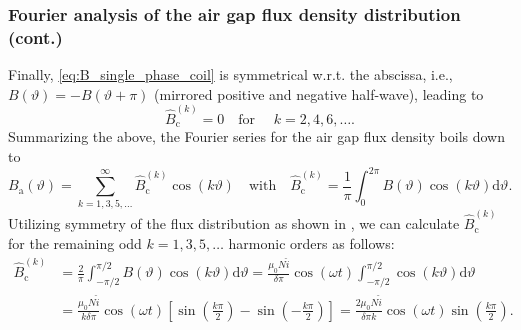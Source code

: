 \begin{frame}
	\frametitle{Fourier analysis of the air gap flux density distribution (cont.)}
        Finally, \eqref{eq:B_single_phase_coil} is symmetrical w.r.t. the abscissa, i.e., $B(\vartheta)=-B(\vartheta+\pi)$ (mirrored positive and negative half-wave), leading to
        $$\hat{B}_{\mathrm{c}}^{(k)} = 0 \quad \mbox{for } \quad k=2,4,6,\ldots .$$
        Summarizing the above, the Fourier series for the air gap flux density boils down to
        \begin{equation}
            B_\mathrm{a}(\vartheta) = \sum_{k=1,3,5,\ldots}^{\infty} \hat{B}_{\mathrm{c}}^{(k)} \cos(k \vartheta) \quad \mbox{with} \quad \hat{B}_{\mathrm{c}}^{(k)} = \frac{1}{\pi} \int_{0}^{2 \pi} B(\vartheta) \cos(k \vartheta) \mathrm{d}\vartheta.
            \label{eq:fourier_series_B_single_phase_coil_reduced}
        \end{equation}
        Utilizing symmetry of the flux distribution as shown in , we can calculate $\hat{B}_{\mathrm{c}}^{(k)}$ for the remaining odd $k=1,3,5,\ldots$ harmonic orders as follows:
        \begin{equation}
            \begin{split}
                \hat{B}_{\mathrm{c}}^{(k)} &= \frac{2}{\pi} \int_{-\pi/2}^{\pi/2} B(\vartheta) \cos(k \vartheta) \mathrm{d}\vartheta = \frac{\mu_0 N \hat{i}}{\delta \pi } \cos(\omega t) \int_{-\pi/2}^{\pi/2} \cos(k \vartheta) \mathrm{d}\vartheta \\ &= \frac{\mu_0 N \hat{i}}{k \delta \pi } \cos(\omega t) \left[ \sin(\frac{k \pi}{2}) - \sin(-\frac{k \pi}{2}) \right] = \frac{2 \mu_0 N \hat{i}}{\delta \pi k} \cos(\omega t) \sin(\frac{k \pi}{2}).
            \end{split}
        \end{equation}
\end{frame}

